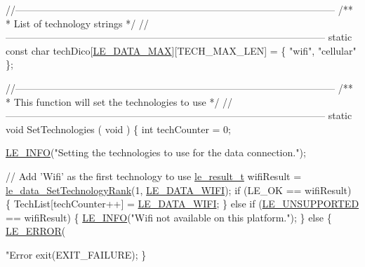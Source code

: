 \begin{DoxyCodeInclude}
\textcolor{comment}{//--------------------------------------------------------------------------------------------------}\textcolor{comment}{}
\textcolor{comment}{/**}
\textcolor{comment}{ *  List of technology strings}
\textcolor{comment}{ */}
\textcolor{comment}{//--------------------------------------------------------------------------------------------------}
\textcolor{keyword}{static} \textcolor{keyword}{const} \textcolor{keywordtype}{char} techDico[\hyperlink{le__data__interface_8h_a245d12b4d3367d81c0fc8b76fa60674aa5143acc7e16842ac4cf33afa34b50c0b}{LE\_DATA\_MAX}][TECH\_MAX\_LEN] = \{
    \textcolor{stringliteral}{"wifi"},
    \textcolor{stringliteral}{"cellular"}
\};

\textcolor{comment}{//--------------------------------------------------------------------------------------------------}\textcolor{comment}{}
\textcolor{comment}{/**}
\textcolor{comment}{ *  This function will set the technologies to use}
\textcolor{comment}{ */}
\textcolor{comment}{//--------------------------------------------------------------------------------------------------}
\textcolor{keyword}{static} \textcolor{keywordtype}{void} SetTechnologies
(
    \textcolor{keywordtype}{void}
)
\{
    \textcolor{keywordtype}{int} techCounter = 0;

    \hyperlink{le__log_8h_a23e6d206faa64f612045d688cdde5808}{LE\_INFO}(\textcolor{stringliteral}{"Setting the technologies to use for the data connection."});

    \textcolor{comment}{// Add 'Wifi' as the first technology to use}
    \hyperlink{le__basics_8h_a1cca095ed6ebab24b57a636382a6c86c}{le\_result\_t} wifiResult = \hyperlink{le__data__interface_8h_aeb5f71861d30b8442b2c11ca34bc73c4}{le\_data\_SetTechnologyRank}(1, 
      \hyperlink{le__data__interface_8h_a245d12b4d3367d81c0fc8b76fa60674aadad1d51bb56b95e60bdae2656be89904}{LE\_DATA\_WIFI});
    \textcolor{keywordflow}{if} (LE\_OK == wifiResult)
    \{
        TechList[techCounter++] = \hyperlink{le__data__interface_8h_a245d12b4d3367d81c0fc8b76fa60674aadad1d51bb56b95e60bdae2656be89904}{LE\_DATA\_WIFI};
    \}
    \textcolor{keywordflow}{else} \textcolor{keywordflow}{if} (\hyperlink{le__basics_8h_a1cca095ed6ebab24b57a636382a6c86ca5377262702e8434207b03533259e0c5f}{LE\_UNSUPPORTED} == wifiResult)
    \{
        \hyperlink{le__log_8h_a23e6d206faa64f612045d688cdde5808}{LE\_INFO}(\textcolor{stringliteral}{"Wifi not available on this platform."});
    \}
    \textcolor{keywordflow}{else}
    \{
        \hyperlink{le__log_8h_a353590f91b3143a7ba3a416ae5a50c3d}{LE\_ERROR}(\textcolor{stringliteral}{"Error %
        exit(EXIT\_FAILURE);
    \}

}
\end{DoxyCodeInclude}

